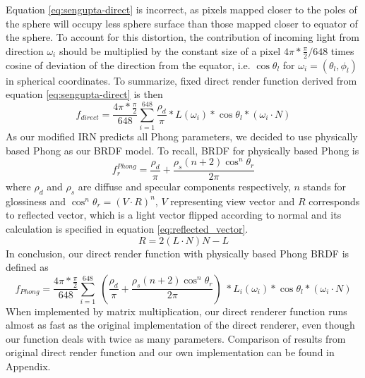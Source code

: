 \newline
Equation \ref{eq:sengupta-direct} is incorrect, as pixels mapped closer to the poles of the sphere will occupy less sphere surface than those mapped closer to equator of the sphere. To account for this distortion, the contribution of incoming light from direction $\omega_i$ should be multiplied by the constant size of a pixel $ 4 \pi * \frac{\pi}{2} / 648$ times cosine of deviation of the direction from the equator, i.e. $\cos \theta_l$ for $\omega_i = (\theta_l, \phi_l)$ in spherical coordinates.
To summarize, fixed direct render function derived from equation \ref{eq:sengupta-direct} is then
\begin{equation}
    f_{direct} = \frac{4\pi * \frac{\pi}{2}}{648} \sum_{i = 1}^{648} \frac{\rho_d}{\pi} * L(\omega_i) * \cos \theta_l * (\omega_i \cdot N) 
    \label{eq:sengupta-direct-fix}
\end{equation}
\newline
As our modified IRN predicts all Phong parameters, we decided to use physically based Phong as our BRDF model. To recall, BRDF for physically based Phong is
\begin{equation}
    f^{Phong}_r = \frac{\rho_d}{\pi} + \frac{\rho_s(n + 2)\cos^n \theta_r}{2\pi}
\end{equation}
where $\rho_d$ and $\rho_s$ are diffuse and specular components respectively, $n$ stands for glossiness and $\cos^n \theta_r = (V \cdot R)^n$, $V$ representing view vector and $R$ corresponds to reflected vector, which is a light vector flipped according to normal and its calculation is specified in equation \ref{eq:reflected_vector}.
\begin{equation}
    R = 2(L \cdot N)N - L
    \label{eq:reflected_vector}
\end{equation}
In conclusion, our direct render function with physically based Phong BRDF is defined as
\begin{equation}
    f_{Phong} = \frac{4\pi * \frac{\pi}{2}}{648} \sum_{i = 1}^{648} \; (\frac{\rho_d}{\pi} + \frac{\rho_s(n + 2)\cos^n \theta_r}{2\pi}) \; * L_i(\omega_i) * \cos \theta_l * (\omega_i \cdot N)
    \label{eq:direct-phong}
\end{equation}
When implemented by matrix multiplication, our direct renderer function runs almost as fast as the original implementation of the direct renderer, even though our function deals with twice as many parameters. Comparison of results from original direct render function and our own implementation can be found in Appendix.
